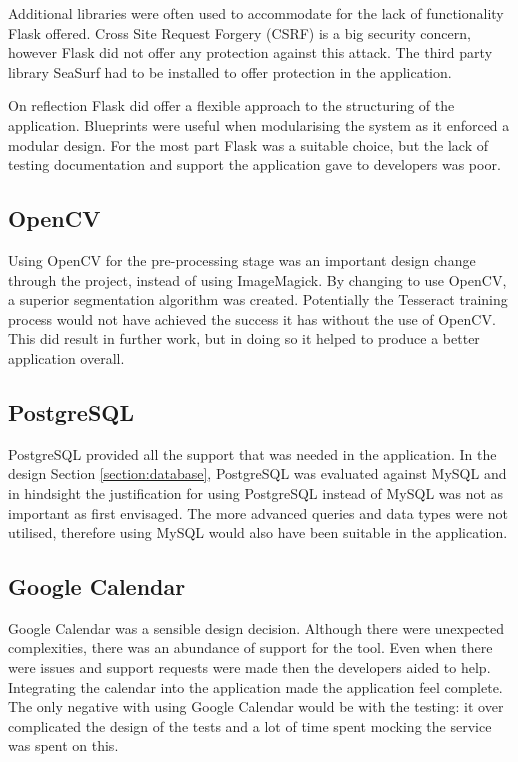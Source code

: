 Additional libraries were often used to accommodate for the lack of functionality Flask offered. Cross Site Request Forgery (CSRF) is a big security concern, however Flask did not offer any protection against this attack. The third party library SeaSurf \cite{citeulike:14025881} had to be installed to offer protection in the application.

On reflection Flask did offer a flexible approach to the structuring of the application. Blueprints were useful when modularising the system as it enforced a modular design. For the most part Flask was a suitable choice, but the lack of testing documentation and support the application gave to developers was poor.

\subsection{OpenCV}
Using OpenCV for the pre-processing stage was an important design change through the project, instead of using ImageMagick. By changing to use OpenCV, a superior segmentation algorithm was created. Potentially the Tesseract training process would not have achieved the success it has without the use of OpenCV. This did result in further work,  but in doing so it helped to produce a better application overall.

\subsection{PostgreSQL}
PostgreSQL provided all the support that was needed in the application. In the design Section \ref{section:database}, PostgreSQL was evaluated against MySQL and in hindsight the justification for using PostgreSQL instead of MySQL was not as important as first envisaged. The more advanced queries and data types were not utilised, therefore using MySQL would also have been suitable in the application.

\subsection{Google Calendar}
Google Calendar was a sensible design decision. Although there were unexpected complexities, there was an abundance of support for the tool. Even when there were issues and support requests were made then the developers aided to help. Integrating the calendar into the application made the application feel complete. The only negative with using Google Calendar would be with the testing: it over complicated the design of the tests and a lot of time spent mocking the service was spent on this.

